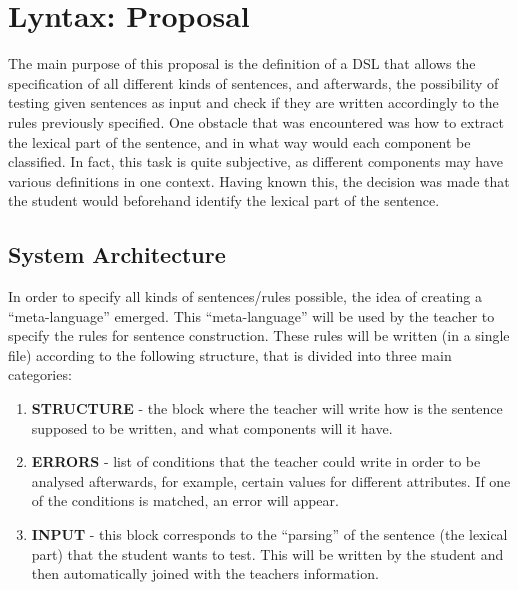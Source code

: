 \chapter{Lyntax: Proposal} \label{lyntax_proposal}

The main purpose of this proposal is the definition of a \textsc{DSL} that allows the specification of all different kinds of sentences, and afterwards, the possibility of testing given sentences as input and check if they are written accordingly to the rules previously specified. One obstacle that was encountered was how to extract the lexical part of the sentence, and in what way would each component be classified. In fact, this task is quite subjective, as different components may have various definitions in one context. %
Having known this, the decision was made that the student would beforehand identify the lexical part of the sentence.


\section{System Architecture}
In order to specify all kinds of sentences/rules possible, the idea of creating a ``meta-language'' emerged. This ``meta-language'' will be used by the teacher to specify the rules for sentence construction. 
These rules will be written (in a single file) according to the following structure, that is divided into three main categories:

\begin{enumerate}
    \item \textbf{STRUCTURE} - the block where the teacher will write how is the sentence supposed to be written, and what components will it have.
    
    \item \textbf{ERRORS} - list of conditions that the teacher could write in order to be analysed afterwards, for example, certain values for different attributes. If one of the conditions is matched, an error will appear.
    
    \item \textbf{INPUT} - this block corresponds to the ``parsing'' of the sentence (the lexical part) that the student wants to test. This will be written by the student and then automatically joined with the teachers information.
\end{enumerate}

